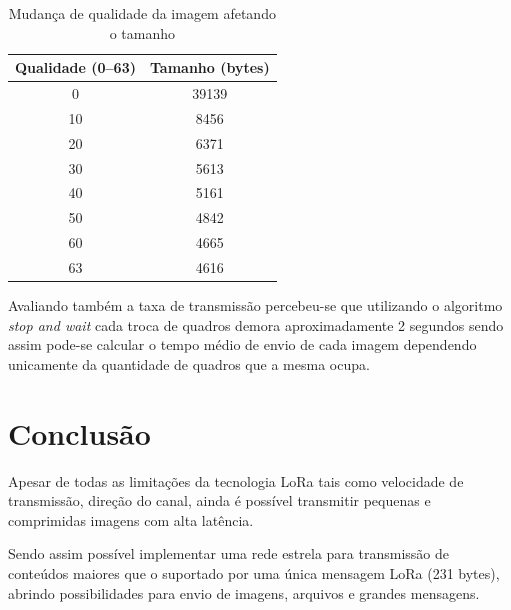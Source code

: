 \documentclass[
article,			%
12pt,				%
oneside,			%
a4paper,			%
english,			%
brazil,				%
sumario=tradicional
]{abntex2}
\begin{document}
\begin{table}[!h]
\centering
\begin{tabular}{@{}c|c@{}}
\toprule
Qualidade (0--63) & Tamanho (bytes) \\ \midrule
0                & 39139           \\
10               & 8456            \\
20               & 6371            \\
30               & 5613            \\
40               & 5161            \\
50               & 4842            \\
60               & 4665            \\
63               & 4616            \\ \bottomrule
\end{tabular}
\caption{Mudança de qualidade da imagem afetando o tamanho}
\label{tab:quality}
\end{table}

Avaliando também a taxa de transmissão percebeu-se que utilizando o algoritmo \textit{stop and wait} cada troca de quadros demora aproximadamente 2 segundos sendo assim pode-se calcular o tempo médio de envio de cada imagem dependendo unicamente da quantidade de quadros que a mesma ocupa.

\section{Conclusão}\label{Conclusão}
Apesar de todas as limitações da tecnologia LoRa tais como velocidade de transmissão, direção do canal, ainda é possível transmitir pequenas e comprimidas imagens com alta latência.

Sendo assim possível implementar uma rede estrela para transmissão de conteúdos maiores que o suportado por uma única mensagem LoRa (231 bytes), abrindo possibilidades para envio de imagens, arquivos e grandes mensagens.


\postextual


\end{document}
